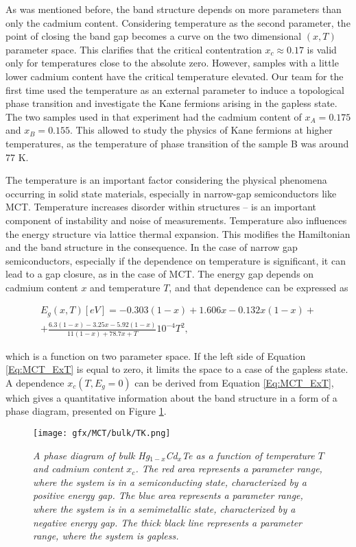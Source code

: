 \documentclass[titlepage,a4paper]{book}
\begin{document}
As was mentioned before, the band structure depends on more parameters than only the cadmium content. Considering temperature as the second parameter, the point of closing the band gap becomes a curve on the two dimensional $(x, T)$ parameter space. This clarifies that the critical contentration $x_c \approx 0.17$ is valid only for temperatures close to the absolute zero. However, samples with a little lower cadmium content have the critical temperature elevated. Our team \cite{Teppe_MCT} for the first time used the temperature as an external parameter to induce a topological phase transition and investigate the Kane fermions arising in the gapless state. The two samples used in that experiment had the cadmium content of $x_A = 0.175$ and $x_B = 0.155$. This allowed to study the physics of Kane fermions at higher temperatures, as the temperature of phase transition of the sample B was around 77 K.  

The temperature is an important factor considering the physical phenomena occurring in solid state materials, especially in narrow-gap semiconductors like MCT. Temperature increases disorder within structures -- is an important component of instability and noise of measurements. Temperature also influences the energy structure via lattice thermal expansion. This modifies the Hamiltonian and the band structure in the consequence. In the case of narrow gap semiconductors, especially if the dependence on temperature is significant, it can lead to a gap closure, as in the case of MCT. The energy gap depends on cadmium content $x$ and temperature $T$, and that dependence can be expressed as

\begin{equation}
\begin{aligned}
\label{Eq:MCT_ExT}
E_g (x,T)[eV] = -0.303(1-x) + 1.606x - 0.132x(1-x) +\\ +\frac{6.3(1-x)-3.25x-5.92(1-x)}{11(1-x)+78.7x+T}10^{-4}T^2,
\end{aligned}
\end{equation}

which is a function on two parameter space. If the left side of Equation \ref{Eq:MCT_ExT} is equal to zero, it limits the space to a case of the gapless state. A dependence $x_c(T, E_g = 0)$ can be derived from Equation \ref{Eq:MCT_ExT}, which gives a quantitative information about the band structure in a form of a phase diagram, presented on Figure \ref{fig:MCT_TK}. 
\begin{figure}[ht]
	\centering
	\texttt{[image: gfx/MCT/bulk/TK.png]}
	\vspace{-10pt}
	\caption{\textit{A phase diagram of bulk Hg$_{1-x}$Cd$_x$Te as a function of temperature $T$ and cadmium content $x_c$. The red area represents a parameter range, where the system is in a semiconducting state, characterized by a positive energy gap. The blue area represents a parameter range, where the system is in a semimetallic state, characterized by a negative energy gap. The thick black line represents a parameter range, where the system is gapless.}}
	\label{fig:MCT_TK}
\end{figure} 
\end{document}
